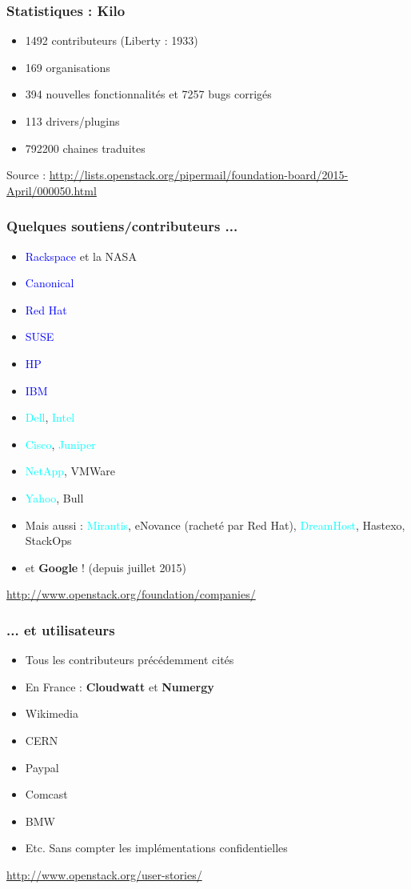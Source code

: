   \begin{frame}
    \frametitle{Statistiques : Kilo}
    \begin{itemize}
      \item 1492 contributeurs (Liberty : 1933)
      \item 169 organisations
      \item 394 nouvelles fonctionnalités et 7257 bugs corrigés
      \item 113 drivers/plugins
      \item 792200 chaines traduites
    \end{itemize}
    Source : \url{http://lists.openstack.org/pipermail/foundation-board/2015-April/000050.html}
  \end{frame}

  \begin{frame}
    \frametitle{Quelques soutiens/contributeurs ...}
    \begin{itemize}
      \item \textcolor{blue}{Rackspace} et la NASA\pause
      \item \textcolor{blue}{Canonical}
      \item \textcolor{blue}{Red Hat}
      \item \textcolor{blue}{SUSE}\pause
      \item \textcolor{blue}{HP}
      \item \textcolor{blue}{IBM}
      \item \textcolor{cyan}{Dell}, \textcolor{cyan}{Intel}
      \item \textcolor{cyan}{Cisco}, \textcolor{cyan}{Juniper}\pause
      \item \textcolor{cyan}{NetApp}, VMWare\pause
      \item \textcolor{cyan}{Yahoo}, Bull\pause
      \item Mais aussi : \textcolor{cyan}{Mirantis}, eNovance (racheté par Red Hat), \textcolor{cyan}{DreamHost}, Hastexo, StackOps\pause
      \item et \textbf{Google} ! (depuis juillet 2015)
    \end{itemize}
    \url{http://www.openstack.org/foundation/companies/}
  \end{frame}

  \begin{frame}
    \frametitle{... et utilisateurs}
    \begin{itemize}
      \item Tous les contributeurs précédemment cités\pause
      \item En France : \textbf{Cloudwatt} et \textbf{Numergy}\pause
      \item Wikimedia
      \item CERN
      \item Paypal
      \item Comcast
      \item BMW\pause
      \item Etc. Sans compter les implémentations confidentielles
    \end{itemize}
    \url{http://www.openstack.org/user-stories/}
  \end{frame}

